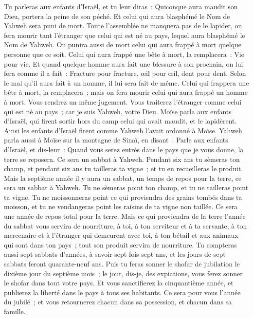 \begin{multicols}{2}
Tu parleras aux enfants d'Israël, et tu leur diras~: Quiconque aura maudit son Dieu, portera la peine de son péché.
Et celui qui aura blasphémé le Nom de Yahweh sera puni de mort. Toute l'assemblée ne manquera pas de le lapider, on fera mourir tant l'étranger que celui qui est né au pays, lequel aura blasphémé le Nom de Yahweh.
On punira aussi de mort celui qui aura frappé à mort quelque personne que ce soit.
Celui qui aura frappé une bête à mort, la remplacera~: Vie pour vie.
Et quand quelque homme aura fait une blessure à son prochain, on lui fera comme il a fait~:
Fracture pour fracture, œil pour œil, dent pour dent. Selon le mal qu'il aura fait à un homme, il lui sera fait de même.
Celui qui frappera une bête à mort, la remplacera~; mais on fera mourir celui qui aura frappé un homme à mort.
Vous rendrez un même jugement. Vous traiterez l'étranger comme celui qui est né au pays~; car je suis Yahweh, votre Dieu.
Moïse parla aux enfants d'Israël, qui firent sortir hors du camp celui qui avait maudit, et le lapidèrent. Ainsi les enfants d'Israël firent comme Yahweh l'avait ordonné à Moïse.
\VerseOne{}Yahweh parla aussi à Moïse sur la montagne de Sinaï, en disant~:
Parle aux enfants d'Israël, et dis-leur~: Quand vous serez entrés dans le pays que je vous donne, la terre se reposera. Ce sera un sabbat à Yahweh.
Pendant six ans tu sèmeras ton champ, et pendant six ans tu tailleras ta vigne~; et tu en recueilleras le produit.
Mais la septième année il y aura un sabbat, un temps de repos pour la terre, ce sera un sabbat à Yahweh. Tu ne sèmeras point ton champ, et tu ne tailleras point ta vigne.
Tu ne moissonneras point ce qui proviendra des grains tombés dans ta moisson, et tu ne vendangeras point les raisins de ta vigne non taillée. Ce sera une année de repos total pour la terre.
Mais ce qui proviendra de la terre l'année du sabbat vous servira de nourriture, à toi, à ton serviteur et à ta servante, à ton mercenaire et à l'étranger qui demeurent avec toi,
à ton bétail et aux animaux qui sont dans ton pays~; tout son produit servira de nourriture.
Tu compteras aussi sept sabbats d'années, à savoir sept fois sept ans, et les jours de sept sabbats feront quarante-neuf ans.
Puis tu feras sonner le shofar de jubilation le dixième jour du septième mois~; le jour, dis-je, des expiations, vous ferez sonner le shofar dans tout votre pays.
Et vous sanctifierez la cinquantième année, et publierez la liberté dans le pays à tous ses habitants. Ce sera pour vous l'année du jubilé~; et vous retournerez chacun dans sa possession, et chacun dans sa famille.

\end{multicols}
